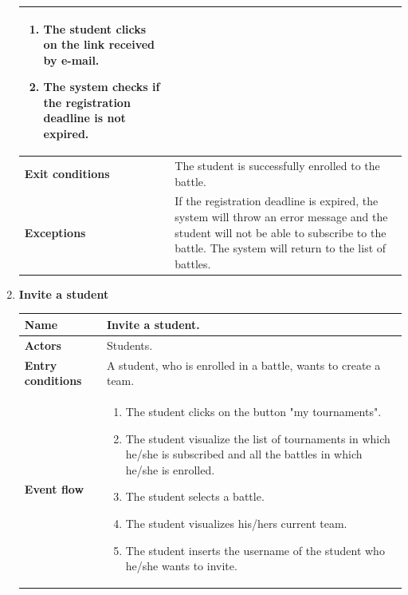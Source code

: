 \begin{enumerate}[label=\textbf{UC.\arabic*}]
\begin{table}[H]
\begin{tabular}{|m{3.2cm}|m{9.8cm}|}
                    \begin{enumerate}[label=\arabic*.]
                        \item The student clicks on the link received by e-mail.
                        \item The system checks if the registration deadline is not expired.
                    \end{enumerate}\\ 
                    \hline
                    \textbf{Exit conditions}  & The student is successfully enrolled to the battle. \\
                    \hline
                    \textbf{Exceptions}  & If the registration deadline is expired, the system will throw an error message and the student will not be able to subscribe to the battle. The system will return to the list of battles.  \\
                    \hline 
                \end{tabular}
        \end{table}
        \item {} \textbf{Invite a student}
        \begin{table}[H]
    	    \centering
                \renewcommand{\arraystretch}{1.5}
                \begin{tabular}{|m{3.2cm}|m{9.8cm}|}
                    \hline
                    \textbf{Name} & Invite a student. \\
                    \hline
                    \textbf{Actors} & Students. \\
                    \hline
                    \textbf{Entry conditions}  & A student, who is enrolled in a battle, wants to create a team. \\
                    \hline
                    \textbf{Event flow}  &  
                    \begin{enumerate}[label=\arabic*.]
                        \item The student clicks on the button "my tournaments".
                        \item The student visualize the list of tournaments in which he/she is subscribed and all the battles in which he/she is enrolled.
                        \item The student selects a battle.
                        \item The student visualizes his/hers current team.
                        \item The student inserts the username of the student who he/she wants to invite.

\end{enumerate}
\end{tabular}
\end{table}
\end{enumerate}
